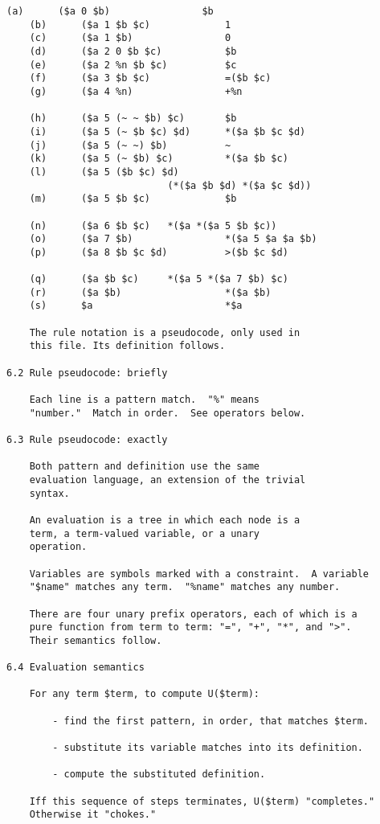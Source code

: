 \documentclass[twoside]{article}
\begin{document}
\begin{lstlisting}[label=lst:u,caption={U: Definition.  The earliest extant Nock.  Only layout has been changed for print.},style=listingcode]
    (a)      ($a 0 $b)                $b
    (b)      ($a 1 $b $c)             1
    (c)      ($a 1 $b)                0
    (d)      ($a 2 0 $b $c)           $b
    (e)      ($a 2 %n $b $c)          $c
    (f)      ($a 3 $b $c)             =($b $c)
    (g)      ($a 4 %n)                +%n

    (h)      ($a 5 (~ ~ $b) $c)       $b
    (i)      ($a 5 (~ $b $c) $d)      *($a $b $c $d)
    (j)      ($a 5 (~ ~) $b)          ~
    (k)      ($a 5 (~ $b) $c)         *($a $b $c)
    (l)      ($a 5 ($b $c) $d)
                            (*($a $b $d) *($a $c $d))
    (m)      ($a 5 $b $c)             $b

    (n)      ($a 6 $b $c)   *($a *($a 5 $b $c))
    (o)      ($a 7 $b)                *($a 5 $a $a $b)
    (p)      ($a 8 $b $c $d)          >($b $c $d)

    (q)      ($a $b $c)     *($a 5 *($a 7 $b) $c)
    (r)      ($a $b)                  *($a $b)
    (s)      $a                       *$a

    The rule notation is a pseudocode, only used in
    this file. Its definition follows.

6.2 Rule pseudocode: briefly

    Each line is a pattern match.  "%" means
    "number."  Match in order.  See operators below.

6.3 Rule pseudocode: exactly

    Both pattern and definition use the same
    evaluation language, an extension of the trivial
    syntax.

    An evaluation is a tree in which each node is a
    term, a term-valued variable, or a unary
    operation.

    Variables are symbols marked with a constraint.  A variable
    "$name" matches any term.  "%name" matches any number.

    There are four unary prefix operators, each of which is a
    pure function from term to term: "=", "+", "*", and ">".
    Their semantics follow.

6.4 Evaluation semantics

    For any term $term, to compute U($term):

        - find the first pattern, in order, that matches $term.

        - substitute its variable matches into its definition.

        - compute the substituted definition.

    Iff this sequence of steps terminates, U($term) "completes."
    Otherwise it "chokes."


\end{lstlisting}
\end{document}
